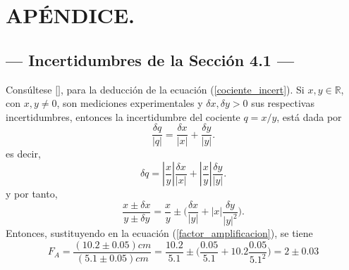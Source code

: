 \documentclass[12pt,a4paper]{article}
\begin{document}



\section{APÉNDICE.} %

\subsection{--- Incertidumbres de la Sección 4.1 ---} %
\label{incertidumbres_4_1}
Consúltese \([\)\cite{incert}\(]\), para la deducción de la ecuación (\ref{cociente_incert}). Si \(x,y \in \mathds{R}\), con \(x,y \ne 0\), son mediciones experimentales y \(\delta x, \delta y>0\) sus respectivas incertidumbres, entonces la incertidumbre del cociente \(q = x/y\), está dada por
\begin{equation}
	\dfrac{\delta q}{|q|} = \dfrac{\delta x}{|x|} + \dfrac{\delta y}{|y|}.
	\label{cociente_incert}
\end{equation}
es decir,
\[
	\delta q = \left| \dfrac{x}{y} \right| \dfrac{\delta x}{|x|} + \left| \dfrac{x}{y} \right| \dfrac{\delta y}{|y|}.  
\]
y por tanto,
\begin{equation}
	\dfrac{x\pm \delta x}{y\pm \delta y} = \dfrac{x}{y} \pm \Bigg(\dfrac{\delta x}{|y|} + |x|\dfrac{\delta y}{|y|^2}\Bigg).
	\label{eq:calculo_incert}
\end{equation}
Entonces, sustituyendo en la ecuación (\ref{factor_amplificacion}), se tiene
\begin{equation}
		F_A=\dfrac{(10.2 \pm 0.05) cm}{(5.1 \pm 0.05) cm} = \dfrac{10.2}{5.1} \pm \Bigg(\dfrac{0.05}{5.1} + 10.2\dfrac{0.05}{5.1^2}\Bigg) = 2 \pm 0.03
	\label{eq:factor_resc}
\end{equation}

\newpage
\end{document}
